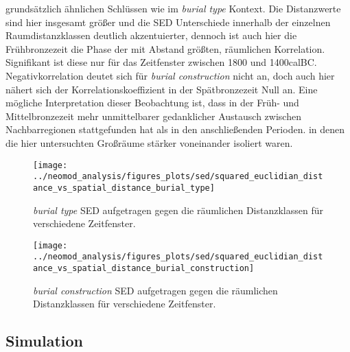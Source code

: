 \documentclass[openany,twoside,twocolumn]{book}
\begin{document}
grundsätzlich ähnlichen Schlüssen wie im \emph{burial type} Kontext. Die
Distanzwerte sind hier insgesamt größer und die SED Unterschiede
innerhalb der einzelnen Raumdistanzklassen deutlich akzentuierter,
dennoch ist auch hier die Frühbronzezeit die Phase der mit Abstand
größten, räumlichen Korrelation. Signifikant ist diese nur für das
Zeitfenster zwischen 1800 und 1400calBC. Negativkorrelation deutet sich
für \emph{burial construction} nicht an, doch auch hier nähert sich der
Korrelationskoeffizient in der Spätbronzezeit Null an. Eine mögliche
Interpretation dieser Beobachtung ist, dass in der Früh- und
Mittelbronzezeit mehr unmittelbarer gedanklicher Austausch zwischen
Nachbarregionen stattgefunden hat als in den anschließenden Perioden. in
denen die hier untersuchten Großräume stärker voneinander isoliert
waren.

\begin{landscape}
\begin{figure}
\texttt{[image: ../neomod\_analysis/figures\_plots/sed/squared\_euclidian\_distance\_vs\_spatial\_distance\_burial\_type]} \caption[\textit{burial type} SED aufgetragen gegen die räumlichen Distanzklassen für verschiedene Zeitfenster]{\textit{burial type} SED aufgetragen gegen die räumlichen Distanzklassen für verschiedene Zeitfenster.}\label{fig:mantel-bt-spatial}
\end{figure}
\end{landscape}

\begin{landscape}
\begin{figure}
\texttt{[image: ../neomod\_analysis/figures\_plots/sed/squared\_euclidian\_distance\_vs\_spatial\_distance\_burial\_construction]} \caption[\textit{burial construction} SED aufgetragen gegen die räumlichen Distanzklassen für verschiedene Zeitfenster]{\textit{burial construction} SED aufgetragen gegen die räumlichen Distanzklassen für verschiedene Zeitfenster.}\label{fig:mantel-bc-spatial}
\end{figure}
\end{landscape}

\hypertarget{simulation-1}{%
\subsection{Simulation}\label{simulation-1}}
\end{document}
